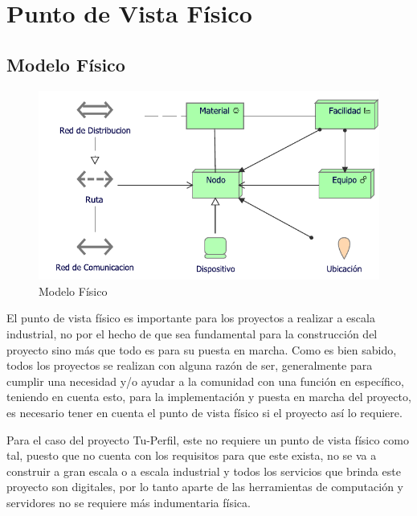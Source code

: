 \section{Punto de Vista Físico}
\subsection{Modelo Físico}
\begin{figure}[h!]
	\centering
	\includegraphics[width=.9\linewidth]{imgs/modelo/Fisico}
	\caption{Modelo Físico}
\end{figure}

El punto de vista físico es importante para los proyectos a realizar a escala industrial, no por el hecho de que sea fundamental para la construcción del proyecto sino más que todo es para su puesta en marcha. Como es bien sabido, todos los proyectos se realizan con alguna razón de ser, generalmente para cumplir una necesidad y/o ayudar a la comunidad con una función en específico, teniendo en cuenta esto, para la implementación y puesta en marcha del proyecto, es necesario tener en cuenta el punto de vista físico si el proyecto  así lo requiere.

Para el caso del proyecto Tu-Perfil, este no requiere un punto de vista físico como tal, puesto que no cuenta con los requisitos para que este exista, no se va a construir a gran escala o a escala industrial y todos los servicios que brinda este proyecto son digitales, por lo tanto aparte de las herramientas de computación y servidores no se requiere más indumentaria física.

\clearpage
